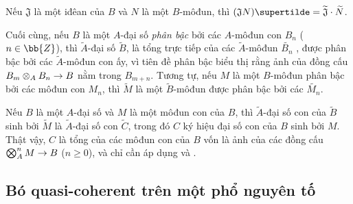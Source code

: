 \documentclass[oneside]{amsart}
\makeatletter
\renewcommand{\geq}{\geqslant}
\newcommand{\ega@arrow}[2]{\mathchoice{#1}{#2}{#2}{#2}}
\renewcommand{\to}{\ega@arrow{\longrightarrow}{\rightarrow}}
\let\EGAOriginalLabel\label
\renewcommand{\label}[1]{\phantomsection\EGAOriginalLabel{#1}}
\makeatother
\begin{document}
\begin{env}[1.3.13]
Nếu $\mathfrak{J}$ là một iđêan của $B$ và $N$ là một $B$-môđun, thì $(\mathfrak{J}N)\supertilde=\widetilde{\mathfrak{J}}\cdot\widetilde{N}$.

Cuối cùng, nếu $B$ là một $A$-đại số \emph{phân bậc} bởi các $A$-môđun con $B_n$ ($n\in\bb{Z}$), thì $\widetilde{A}$-đại số $\widetilde{B}$, là tổng trực tiếp của các $\widetilde{A}$-môđun $\widetilde{B_n}$ , được phân bậc bởi các $\widetilde{A}$-môđun con ấy, vì tiên đề phân bậc biểu thị rằng ảnh của đồng cấu $B_m\otimes_A B_n\to B$ nằm trong $B_{m+n}$.
Tương tự, nếu $M$ là một $B$-môđun phân bậc bởi các môđun con $M_n$, thì $\widetilde{M}$ là một $\widetilde{B}$-môđun được phân bậc bởi các $\widetilde{M_n}$.
\end{env}

\begin{env}[1.3.14]
\label{I.1.3.14}
Nếu $B$ là một $A$-đại số và $M$ là một môđun con của $B$, thì $\widetilde{A}$-đại số con của $\widetilde{B}$ sinh bởi $\widetilde{M}$  là $\widetilde{A}$-đại số con $\widetilde{C}$, trong đó $C$ ký hiệu đại số con của $B$ sinh bởi $M$.
Thật vậy, $C$ là tổng của các môđun con của $B$ vốn là ảnh của các đồng cấu $\bigotimes_A^n M\to B$ ($n\geq 0$), và chỉ cần áp dụng  và .
\end{env}

\subsection{Bó quasi-coherent trên một phổ nguyên tố}
\label{subsection:I.1.4}
\end{document}
